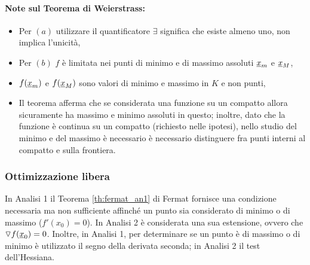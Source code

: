 \paragraph{Note sul Teorema di Weierstrass:}
\begin{itemize}
	\item Per $(a)$ utilizzare il quantificatore $\exists$ significa che esiste almeno uno, non implica l'unicità,
	\item Per $(b)$ $f$ è limitata nei punti di minimo e di massimo assoluti $\uline x_m$ e $\uline x_M$,
	\item $f(\uline x_m)$ e $f(\uline x_M)$ sono valori di minimo e massimo in $K$ e non punti,
	\item Il teorema afferma che se considerata una funzione su un compatto allora sicuramente ha massimo e minimo assoluti in questo; inoltre, dato che la funzione è continua su un compatto (richiesto nelle ipotesi), nello studio del minimo e del massimo è necessario è necessario distinguere fra punti interni al compatto e sulla frontiera.
\end{itemize}

\subsubsection{Ottimizzazione libera}
In Analisi 1 il Teorema \ref{th:fermat_an1} di Fermat fornisce una condizione necessaria ma non sufficiente affinché un punto sia considerato di minimo o di massimo ($f'(x_0)=0$). In Analisi 2 è considerata una sua estensione, ovvero che $\triangledown f(\uline x_0)=0$. Inoltre, in Analisi 1, per determinare se un punto è di massimo o di minimo è utilizzato il segno della derivata seconda; in Analisi 2 il test dell'Hessiana.

